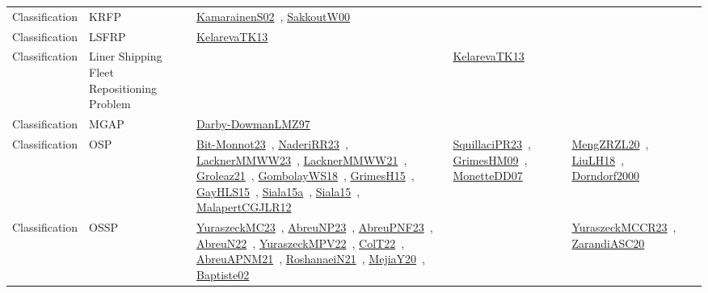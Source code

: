 {\begin{longtable}{lp{3cm}>{\raggedright\arraybackslash}p{6cm}>{\raggedright\arraybackslash}p{6cm}>{\raggedright\arraybackslash}p{8cm}}
\index{KRFP}\index{Classification!KRFP}Classification & KRFP & \href{../works/KamarainenS02.pdf}{KamarainenS02}~\cite{KamarainenS02}, \href{../works/SakkoutW00.pdf}{SakkoutW00}~\cite{SakkoutW00} &  & \\
\index{LSFRP}\index{Classification!LSFRP}Classification & LSFRP & \href{../works/KelarevaTK13.pdf}{KelarevaTK13}~\cite{KelarevaTK13} &  & \\
\index{Liner Shipping Fleet Repositioning Problem}\index{Classification!Liner Shipping Fleet Repositioning Problem}Classification & Liner Shipping Fleet Repositioning Problem &  & \href{../works/KelarevaTK13.pdf}{KelarevaTK13}~\cite{KelarevaTK13} & \\
\index{MGAP}\index{Classification!MGAP}Classification & MGAP & \href{../works/Darby-DowmanLMZ97.pdf}{Darby-DowmanLMZ97}~\cite{Darby-DowmanLMZ97} &  & \\
\index{OSP}\index{Classification!OSP}Classification & OSP & \href{../works/Bit-Monnot23.pdf}{Bit-Monnot23}~\cite{Bit-Monnot23}, \href{../works/NaderiRR23.pdf}{NaderiRR23}~\cite{NaderiRR23}, \href{../works/LacknerMMWW23.pdf}{LacknerMMWW23}~\cite{LacknerMMWW23}, \href{../works/LacknerMMWW21.pdf}{LacknerMMWW21}~\cite{LacknerMMWW21}, \href{../works/Groleaz21.pdf}{Groleaz21}~\cite{Groleaz21}, \href{../works/GombolayWS18.pdf}{GombolayWS18}~\cite{GombolayWS18}, \href{../works/GrimesH15.pdf}{GrimesH15}~\cite{GrimesH15}, \href{../works/GayHLS15.pdf}{GayHLS15}~\cite{GayHLS15}, \href{../works/Siala15a.pdf}{Siala15a}~\cite{Siala15a}, \href{../works/Siala15.pdf}{Siala15}~\cite{Siala15}, \href{../works/MalapertCGJLR12.pdf}{MalapertCGJLR12}~\cite{MalapertCGJLR12} & \href{../works/SquillaciPR23.pdf}{SquillaciPR23}~\cite{SquillaciPR23}, \href{../works/GrimesHM09.pdf}{GrimesHM09}~\cite{GrimesHM09}, \href{../works/MonetteDD07.pdf}{MonetteDD07}~\cite{MonetteDD07} & \href{../works/MengZRZL20.pdf}{MengZRZL20}~\cite{MengZRZL20}, \href{../works/LiuLH18.pdf}{LiuLH18}~\cite{LiuLH18}, \href{../works/Dorndorf2000.pdf}{Dorndorf2000}~\cite{Dorndorf2000}\\
\index{OSSP}\index{Classification!OSSP}Classification & OSSP & \href{../works/YuraszeckMC23.pdf}{YuraszeckMC23}~\cite{YuraszeckMC23}, \href{../works/AbreuNP23.pdf}{AbreuNP23}~\cite{AbreuNP23}, \href{../works/AbreuPNF23.pdf}{AbreuPNF23}~\cite{AbreuPNF23}, \href{../works/AbreuN22.pdf}{AbreuN22}~\cite{AbreuN22}, \href{../works/YuraszeckMPV22.pdf}{YuraszeckMPV22}~\cite{YuraszeckMPV22}, \href{../works/ColT22.pdf}{ColT22}~\cite{ColT22}, \href{../works/AbreuAPNM21.pdf}{AbreuAPNM21}~\cite{AbreuAPNM21}, \href{../works/RoshanaeiN21.pdf}{RoshanaeiN21}~\cite{RoshanaeiN21}, \href{../works/MejiaY20.pdf}{MejiaY20}~\cite{MejiaY20}, \href{../works/Baptiste02.pdf}{Baptiste02}~\cite{Baptiste02} &  & \href{../works/YuraszeckMCCR23.pdf}{YuraszeckMCCR23}~\cite{YuraszeckMCCR23}, \href{../works/ZarandiASC20.pdf}{ZarandiASC20}~\cite{ZarandiASC20}\\

\end{longtable}}
